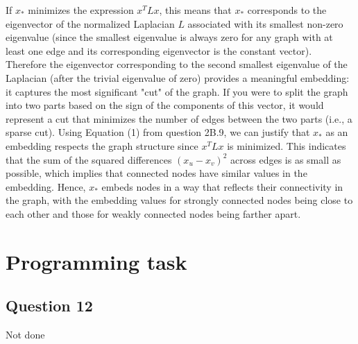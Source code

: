\documentclass{article}
\begin{document}
If \( x_* \) minimizes the expression \( x^T L x \), this means that \( x_* \) corresponds to the eigenvector of the normalized Laplacian \( L \) associated with its smallest non-zero eigenvalue (since the smallest eigenvalue is always zero for any graph with at least one edge and its corresponding eigenvector is the constant vector).
Therefore the eigenvector corresponding to the second smallest eigenvalue of the Laplacian (after the trivial eigenvalue of zero) provides a meaningful embedding: it captures the most significant "cut" of the graph. If you were to split the graph into two parts based on the sign of the components of this vector, it would represent a cut that minimizes the number of edges between the two parts (i.e., a sparse cut).
Using Equation (1) from question 2B.9, we can justify that \( x_* \) as an embedding respects the graph structure since \( x^T L x \) is minimized. This indicates that the sum of the squared differences \( (x_u - x_v)^2 \) across edges is as small as possible, which implies that connected nodes have similar values in the embedding. Hence, \( x_* \) embeds nodes in a way that reflects their connectivity in the graph, with the embedding values for strongly connected nodes being close to each other and those for weakly connected nodes being farther apart.

\section{Programming task}

\subsection{Question 12}
Not done
\end{document}
